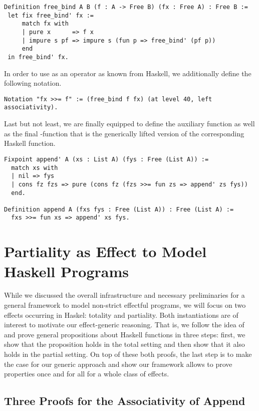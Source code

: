 \begin{verbatim}
Definition free_bind A B (f : A -> Free B) (fx : Free A) : Free B :=
 let fix free_bind' fx :=
     match fx with
     | pure x      => f x
     | impure s pf => impure s (fun p => free_bind' (pf p))
     end
 in free_bind' fx.
\end{verbatim}

In order to use  as an operator \cinl{(>>=)} as known from Haskell, we additionally define the following notation.

\begin{verbatim}
Notation "fx >>= f" := (free_bind f fx) (at level 40, left associativity).
\end{verbatim}

Last but not least, we are finally equipped to define the auxiliary function  as well as the final -function that is the generically lifted version of the corresponding Haskell function.

\begin{verbatim}
Fixpoint append' A (xs : List A) (fys : Free (List A)) :=
  match xs with
  | nil => fys
  | cons fz fzs => pure (cons fz (fzs >>= fun zs => append' zs fys))
  end.

Definition append A (fxs fys : Free (List A)) : Free (List A) :=
  fxs >>= fun xs => append' xs fys.
\end{verbatim}

\section{Partiality as Effect to Model Haskell Programs}

While we discussed the overall infrastructure and necessary preliminaries for a general framework to model non-strict effectful
programs, we will focus on two effects occurring in Haskel: totality and partiality.
Both instantiations are of interest to motivate our effect-generic reasoning.
That is, we follow the idea of \citet{abel2005verifying} and prove general propositions about Haskell functions in three steps: first, we show that the proposition holds in the total setting and then show that it also holds in the partial setting.
On top of these both proofs, the last step is to make the case for our generic approach and show our framework allows to prove properties once and for all for a whole class of effects.

\subsection{Three Proofs for the Associativity of Append}

